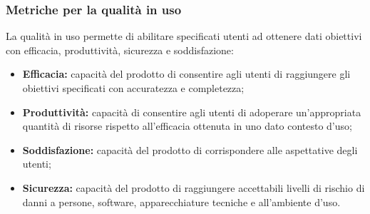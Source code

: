 \subsubsection{Metriche per la qualità in uso}
La qualità in uso permette di abilitare specificati utenti ad ottenere dati obiettivi con efficacia, produttività, sicurezza e soddisfazione:
\begin{itemize}
    \item \textbf{Efficacia:} capacità del prodotto di consentire agli utenti di raggiungere gli obiettivi specificati con accuratezza e completezza;
    \item \textbf{Produttività:} capacità di consentire agli utenti di adoperare un'appropriata quantità di risorse rispetto all'efficacia ottenuta in uno dato contesto d'uso;
    \item \textbf{Soddisfazione:} capacità del prodotto di corrispondere alle aspettative degli utenti;
    \item \textbf{Sicurezza:} capacità del prodotto di raggiungere accettabili livelli di rischio di danni a persone, software, apparecchiature tecniche e all'ambiente d'uso.
\end{itemize}